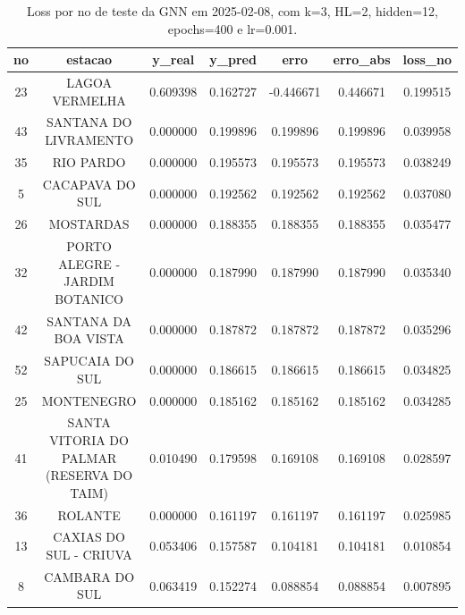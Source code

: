\begin{table}[h]
\centering
\caption{Loss por no de teste da GNN em 2025-02-08, com k=3, HL=2, hidden=12, epochs=400 e lr=0.001.}
\label{tab:gnn_loss_k3_hl2_h12_e400_d20250208}
\begin{tabular}{ccccccc}
\toprule
no & estacao & y\_real & y\_pred & erro & erro\_abs & loss\_no \\
\midrule
23 & LAGOA VERMELHA & 0.609398 & 0.162727 & -0.446671 & 0.446671 & 0.199515 \\
43 & SANTANA DO LIVRAMENTO & 0.000000 & 0.199896 & 0.199896 & 0.199896 & 0.039958 \\
35 & RIO PARDO & 0.000000 & 0.195573 & 0.195573 & 0.195573 & 0.038249 \\
5 & CACAPAVA DO SUL & 0.000000 & 0.192562 & 0.192562 & 0.192562 & 0.037080 \\
26 & MOSTARDAS & 0.000000 & 0.188355 & 0.188355 & 0.188355 & 0.035477 \\
32 & PORTO ALEGRE - JARDIM BOTANICO & 0.000000 & 0.187990 & 0.187990 & 0.187990 & 0.035340 \\
42 & SANTANA DA BOA VISTA & 0.000000 & 0.187872 & 0.187872 & 0.187872 & 0.035296 \\
52 & SAPUCAIA DO SUL & 0.000000 & 0.186615 & 0.186615 & 0.186615 & 0.034825 \\
25 & MONTENEGRO & 0.000000 & 0.185162 & 0.185162 & 0.185162 & 0.034285 \\
41 & SANTA VITORIA DO PALMAR (RESERVA DO TAIM) & 0.010490 & 0.179598 & 0.169108 & 0.169108 & 0.028597 \\
36 & ROLANTE & 0.000000 & 0.161197 & 0.161197 & 0.161197 & 0.025985 \\
13 & CAXIAS DO SUL - CRIUVA & 0.053406 & 0.157587 & 0.104181 & 0.104181 & 0.010854 \\
8 & CAMBARA DO SUL & 0.063419 & 0.152274 & 0.088854 & 0.088854 & 0.007895 \\
\bottomrule
\end{tabular}
\end{table}

